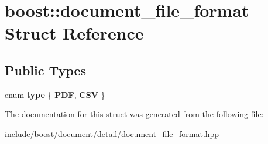 \hypertarget{structboost_1_1document__file__format}{\section{boost\-:\-:document\-\_\-file\-\_\-format Struct Reference}
\label{structboost_1_1document__file__format}
}
\subsection*{Public Types}
\begin{DoxyCompactItemize}
\item 
enum {\bfseries type} \{ {\bfseries P\-D\-F}, 
{\bfseries C\-S\-V}
 \}
\end{DoxyCompactItemize}


The documentation for this struct was generated from the following file\-:\begin{DoxyCompactItemize}
\item 
include/boost/document/detail/document\-\_\-file\-\_\-format.\-hpp\end{DoxyCompactItemize}
